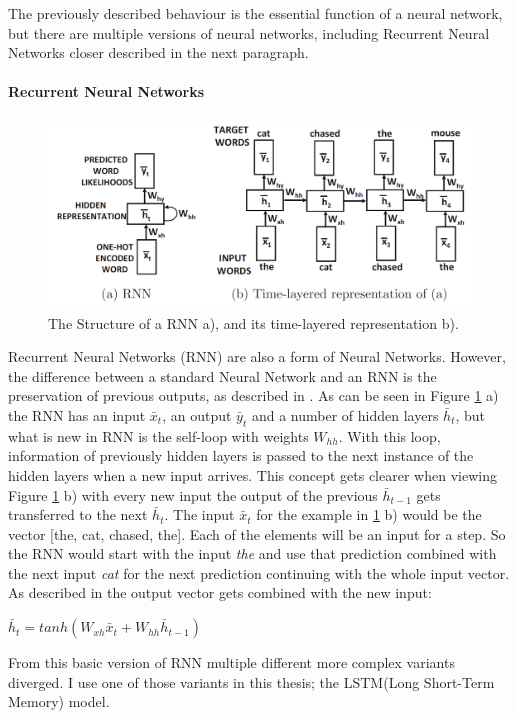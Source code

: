 The previously described behaviour is the essential function of a neural network, but there are multiple versions of neural networks, including Recurrent Neural Networks closer described in the next paragraph.

\paragraph{Recurrent Neural Networks}
\begin{figure}[h]
	\centering
	\includegraphics[width=0.7\linewidth]{Pictures/RNN_Structure}
	\caption{The Structure of a RNN a), and its time-layered representation b). \cite[p. 275]{DeepLearningBook}}
	\label{fig:rnnstructure}
\end{figure}
Recurrent Neural Networks (RNN) are also a form of Neural Networks.
However, the difference between a standard Neural Network and an RNN is the preservation of previous outputs, as described in \cite[p. 274ff.]{DeepLearningBook}.
As can be seen in Figure \ref{fig:rnnstructure} a) the RNN has an input $\bar{x}_{t}$, an output $\bar{y}_{t}$ and a number of hidden layers $\bar{h}_{t}$, but what is new in RNN is the self-loop with weights ${W}_{hh}$.
With this loop, information of previously hidden layers is passed to the next instance of the hidden layers when a new input arrives.
This concept gets clearer when viewing Figure \ref{fig:rnnstructure} b) with every new input the output of the previous $\bar{h}_{t-1}$ gets transferred to the next $\bar{h}_{t}$.
The input $\bar{x}_{t}$ for the example in \ref{fig:rnnstructure} b) would be the vector [the, cat, chased, the].
Each of the elements will be an input for a step.
So the RNN would start with the input \textit{the} and use that prediction combined with the next input \textit{cat} for the next prediction continuing with the whole input vector.
As described in \cite[p. 276]{DeepLearningBook} the output vector gets combined with the new input:
\begin{displayquote}
	$\bar{h}_{t} = tanh({W}_{xh}\bar{x}_{t} + {W}_{hh}\bar{h}_{t-1})$
\end{displayquote}                
From this basic version of RNN multiple different more complex variants diverged.
I use one of those variants in this thesis; the LSTM(Long Short-Term Memory) model.

